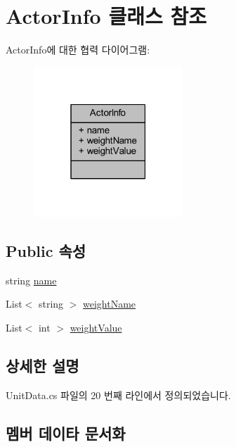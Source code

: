 \hypertarget{class_actor_info}{}\section{Actor\+Info 클래스 참조}
\label{class_actor_info}


Actor\+Info에 대한 협력 다이어그램\+:
\nopagebreak
\begin{figure}[H]
\begin{center}
\leavevmode
\includegraphics[width=159pt]{class_actor_info__coll__graph}
\end{center}
\end{figure}
\subsection*{Public 속성}
\begin{DoxyCompactItemize}
\item 
string \hyperlink{class_actor_info_a2e9e540cdc037f204d80622e47543410}{name}
\item 
List$<$ string $>$ \hyperlink{class_actor_info_a25bb8e0eafab630572ffddea088a1f80}{weight\+Name}
\item 
List$<$ int $>$ \hyperlink{class_actor_info_a1c5dd2d46e5ebc5a6483f2bcb55cb162}{weight\+Value}
\end{DoxyCompactItemize}


\subsection{상세한 설명}


Unit\+Data.\+cs 파일의 20 번째 라인에서 정의되었습니다.



\subsection{멤버 데이타 문서화}
